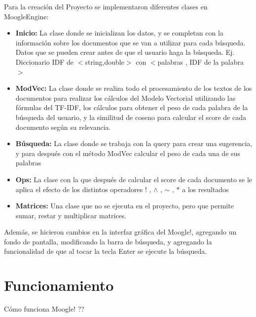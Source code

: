 \documentclass[12pt, a4paper]{article}
\begin{document}
Para la creación del Proyecto se implementaron diferentes clases en MoogleEngine:
\begin{itemize}
      \item \textbf{Inicio:} La clase donde se inicializan los datos, y se completan con la información sobre
            los documentos que se van a utilizar para cada búsqueda. Datos que se pueden crear
            antes de que el usuario haga la búsqueda.
            Ej. Diccionario IDF de $<$string,double$>$ con $<$palabras , IDF de la palabra$>$
      \item \textbf{ModVec:} La clase donde se realiza todo el procesamiento de los textos de los documentos
            para realizar los cálculos del Modelo Vectorial utilizando las fórmulas del TF-IDF,
            los cálculos para obtener el peso de cada palabra de la búsqueda del usuario,
            y la similitud de coseno para calcular el score de cada documento según su relevancia.
      \item \textbf{Búsqueda:} La clase donde se trabaja con la query para crear una sugerencia,
            y para después con el método ModVec calcular el peso de cada una de sus palabras
      \item \textbf{Ops:} La clase con la que después de calcular el score de
            cada documento se le aplica el efecto de los distintos operadores
            ! , $\wedge$ , $\sim$ , * a los resultados
      \item \textbf{Matrices:} Una clase que no se ejecuta en el proyecto, pero que permite sumar,
            restar y multiplicar matrices.

\end{itemize}
Además, se hicieron cambios en la interfaz gráfica del Moogle!,
agregando un fondo de pantalla, modificando la barra de búsqueda,
y agregando la funcionalidad de que al tocar la tecla Enter se
ejecute la búsqueda.

\section{Funcionamiento}

Cómo funciona Moogle! ??
\end{document}
